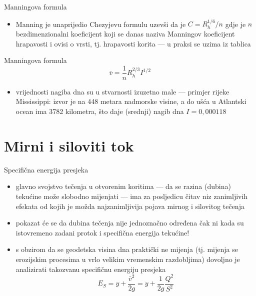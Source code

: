 \documentclass[croatian]{beamer}
\begin{document}
\begin{frame}{Manningova formula}

\begin{itemize}
\item Manning je unaprijedio Chezyjevu formulu uzevši da je $C=R_{h}^{1/6}/n$
gdje je $n$ bezdimenzionalni koeficijent koji se danas naziva \alert{Manningov koeficijent hrapavosti}
i ovisi o vrsti, tj. hrapavosti korita --- u praksi se uzima iz tablica
\end{itemize}
\begin{alertblock}{Manningova formula}
\[
\bar{v}=\frac{1}{n}R_{h}^{2/3}I^{1/2}
\]
\end{alertblock}
\begin{itemize}
\item vrijednosti nagiba dna su u stvarnosti izuzetno male --- primjer
rijeke Mississippi: izvor je na 448 metara nadmorske visine, a do
ušća u Atlantski ocean ima 3782 kilometra, što daje (srednji) nagib
dna $I=0,000118$
\end{itemize}
\end{frame}

\section{Mirni i siloviti tok}
\begin{frame}{Specifična energija presjeka}

\begin{itemize}
\item glavno svojstvo tečenja u otvorenim koritima --- da se razina (dubina)
tekućine može slobodno mijenjati --- ima za posljedicu čitav niz
zanimljivih efekata od kojih je možda najzanimljivija pojava \alert{mirnog}
i \alert{silovitog} tečenja
\item pokazat će se da dubina tečenja nije jednoznačno određena čak ni kada
su istovremeno zadani protok i specifična energija tekućine!
\item s obzirom da se geodetska visina dna praktički ne mijenja (tj. mijenja
se erozijskim procesima u vrlo velikim vremenskim razdobljima) dovoljno
je analizirati takozvanu \alert{specifičnu energiju presjeka}
\[
E_{S}=y+\frac{\bar{v}^{2}}{2g}=y+\frac{1}{2g}\frac{Q^{2}}{S^{2}}
\]
\end{itemize}
\end{frame}
\end{document}

